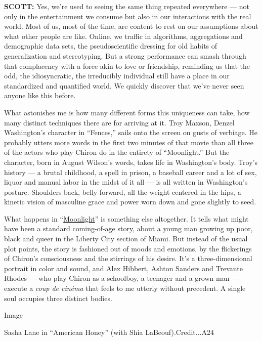 \textbf{SCOTT:} Yes, we're used to seeing the same thing repeated
everywhere --- not only in the entertainment we consume but also in our
interactions with the real world. Most of us, most of the time, are
content to rest on our assumptions about what other people are like.
Online, we traffic in algorithms, aggregations and demographic data
sets, the pseudoscientific dressing for old habits of generalization and
stereotyping. But a strong performance can smash through that
complacency with a force akin to love or friendship, reminding us that
the odd, the idiosyncratic, the irreducibly individual still have a
place in our standardized and quantified world. We quickly discover that
we've never seen anyone like this before.

What astonishes me is how many different forms this uniqueness can take,
how many distinct techniques there are for arriving at it. Troy Maxson,
Denzel Washington's character in ``Fences,'' sails onto the screen on
gusts of verbiage. He probably utters more words in the first two
minutes of that movie than all three of the actors who play Chiron do in
the entirety of ``Moonlight.'' But the character, born in August
Wilson's words, takes life in Washington's body. Troy's history --- a
brutal childhood, a spell in prison, a baseball career and a lot of sex,
liquor and manual labor in the midst of it all --- is all written in
Washington's posture. Shoulders back, belly forward, all the weight
centered in the hips, a kinetic vision of masculine grace and power worn
down and gone slightly to seed.

What happens in
``\href{https://www.nytimes3xbfgragh.onion/2016/10/21/movies/moonlight-review.html}{Moonlight}''
is something else altogether. It tells what might have been a standard
coming-of-age story, about a young man growing up poor, black and queer
in the Liberty City section of Miami. But instead of the usual plot
points, the story is fashioned out of moods and emotions, by the
flickerings of Chiron's consciousness and the stirrings of his desire.
It's a three-dimensional portrait in color and sound, and Alex Hibbert,
Ashton Sanders and Trevante Rhodes --- who play Chiron as a schoolboy, a
teenager and a grown man --- execute a \emph{coup de cinéma} that feels
to me utterly without precedent. A single soul occupies three distinct
bodies.

Image

Sasha Lane in ``American Honey'' (with Shia LaBeouf).Credit...A24

